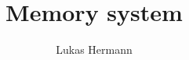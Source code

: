 \documentclass[12pt, a4paper]{article}
\begin{document}
\title{Memory system}
\author{Lukas Hermann}
\maketitle

\tableofcontents

\newpage


\end{document}
